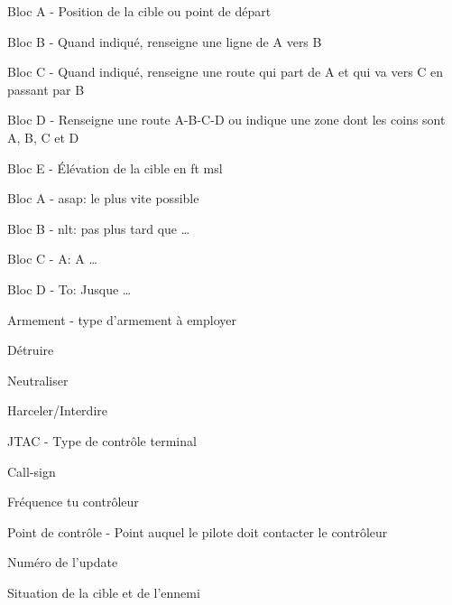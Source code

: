 \begin{e2}[0em]
\begin{e3}[0em]
		\item Bloc A - Position de la cible ou point de départ
		\item Bloc B - Quand indiqué, renseigne une ligne de A vers B
		\item Bloc C - Quand indiqué, renseigne une route qui part de A et qui va vers C en passant par B
		\item Bloc D - Renseigne une route A-B-C-D ou indique une zone dont les coins sont A, B, C et D
		\item Bloc E - Élévation de la cible en \gls{ft} \gls{msl}
	\end{e3}
	\begin{e3}[0em]
		\item Bloc A - \acrshort{asap}: le plus vite possible
		\item Bloc B - \acrshort{nlt}: pas plus tard que \ldots{}
		\item Bloc C - A: A \ldots{}
		\item Bloc D - To: Jusque \ldots{}
	\end{e3}
	\begin{e3}[0em]
		\item Armement - type d'armement à employer
		\item Détruire
		\item Neutraliser
		\item Harceler/Interdire
	\end{e3}
	\begin{e3}[0em]
		\item JTAC - Type de contrôle terminal
		\item Call-sign
		\item Fréquence tu contrôleur
		\item Point de contrôle - Point auquel le pilote doit contacter le contrôleur
	\end{e3}
	\begin{e3}[0em]
		\item Numéro de l'update
		\item Situation de la cible et de l'ennemi

\end{e3}
\end{e2}
